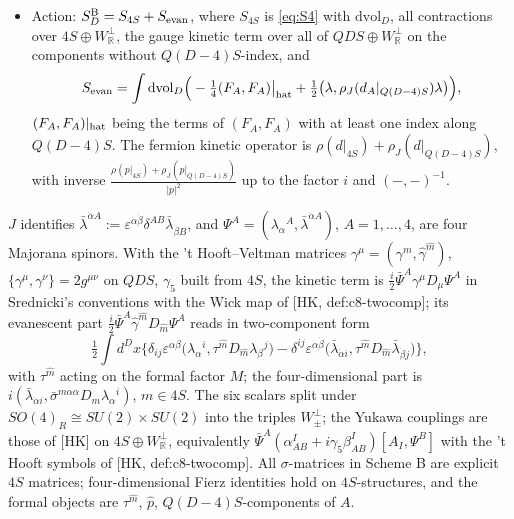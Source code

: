 \begin{definition}[Scheme B]
\begin{itemize}
\item Action: $S^{\rm B}_D=S_{4S}+S_{\rm evan}$, where $S_{4S}$ is \eqref{eq:S4} with $\mathrm{dvol}_D$, all contractions over $4S\oplus W^\perp_{\mathbb R}$, the gauge kinetic term over all of $QDS\oplus W^\perp_{\mathbb R}$ on the components without $Q(D{-}4)S$-index, and
\[
S_{\rm evan}=\int\mathrm{dvol}_D\Big(-\tfrac14(F_A,F_A)\big|_{\rm hat}+\tfrac12\big(\lambda,\rho_J(d_A|_{Q(D-4)S})\lambda\big)\Big),
\]
$(F_A,F_A)|_{\rm hat}$ being the terms of $(F_A,F_A)$ with at least one index along $Q(D{-}4)S$. The fermion kinetic operator is $\rho(d|_{4S})+\rho_J(d|_{Q(D-4)S})$, with inverse $\frac{\rho(p|_{4S})+\rho_J(p|_{Q(D-4)S})}{|p|^2}$ up to the factor $i$ and $(-,-)^{-1}$.
\end{itemize}
\end{definition}

\begin{remark}
\label{rem:B2c}
$J$ identifies $\bar\lambda^{\dot\alpha A}:=\varepsilon^{\dot\alpha\dot\beta}\delta^{AB}\bar\lambda_{\dot\beta B}$, and $\Psi^A=(\lambda_\alpha{}^A,\bar\lambda^{\dot\alpha A})$, $A=1,\dots,4$, are four Majorana spinors. With the 't Hooft--Veltman matrices $\gamma^\mu=(\gamma^m,\hat\gamma^{\hat m})$, $\{\gamma^\mu,\gamma^\nu\}=2g^{\mu\nu}$ on $QDS$, $\gamma_5$ built from $4S$, the kinetic term is $\frac i2\bar\Psi^A\gamma^\mu D_\mu\Psi^A$ in Srednicki's conventions with the Wick map of [HK, def:c8-twocomp]; its evanescent part $\frac i2\bar\Psi^A\hat\gamma^{\hat m}D_{\hat m}\Psi^A$ reads in two-component form
\[
\tfrac12\int d^Dx\Big\{\delta_{ij}\varepsilon^{\alpha\beta}\big(\lambda_\alpha{}^i,\tau^{\hat m}D_{\hat m}\lambda_\beta{}^j\big)-\delta^{ij}\varepsilon^{\dot\alpha\dot\beta}\big(\bar\lambda_{\dot\alpha i},\tau^{\hat m}D_{\hat m}\bar\lambda_{\dot\beta j}\big)\Big\},
\]
with $\tau^{\hat m}$ acting on the formal factor $M$; the four-dimensional part is $i(\bar\lambda_{\dot\alpha i},\bar\sigma^{m\dot\alpha\alpha}D_m\lambda_\alpha{}^i)$, $m\in 4S$. The six scalars split under $SO(4)_R\cong SU(2)\times SU(2)$ into the triples $W^\perp_\pm$; the Yukawa couplings are those of [HK] on $4S\oplus W^\perp_{\mathbb R}$, equivalently $\bar\Psi^A(\alpha^I_{AB}+i\gamma_5\beta^I_{AB})[A_I,\Psi^B]$ with the 't Hooft symbols of [HK, def:c8-twocomp]. All $\sigma$-matrices in Scheme B are explicit $4S$ matrices; four-dimensional Fierz identities hold on $4S$-structures, and the formal objects are $\tau^{\hat m}$, $\hat p$, $Q(D{-}4)S$-components of $A$.
\end{remark}

